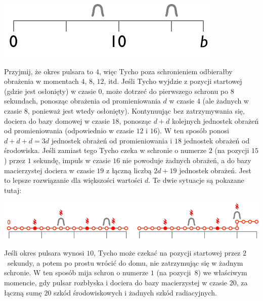 \includegraphics[width=.3\textwidth]{img/samplesetup}

Przyjmij, że okres pulsara to $4$, więc Tycho poza schronieniem odbierałby obrażenia w momentach $4$, $8$, $12$, itd.
Jeśli Tycho wyjdzie z pozycji startowej (gdzie jest osłonięty) w czasie $0$, może dotrzeć do pierwszego schronu po $8$ sekundach, ponosząc obrażenia od promieniowania $d$ w czasie $4$ (ale żadnych w czasie $8$, ponieważ jest wtedy osłonięty).
Kontynuując bez zatrzymywania się, dociera do bazy domowej w czasie $18$, ponosząc $d+d$ kolejnych jednostek obrażeń od promieniowania (odpowiednio w czasie $12$ i $16$).
W ten sposób ponosi $d+d+d=3d$ jednostek obrażeń od promieniowania i $18$ jednostek obrażeń od środowiska.
Jeśli zamiast tego Tycho czeka w schronie o numerze $2$ (na pozycji $15$) przez $1$ sekundę, impuls w czasie $16$ nie powoduje żadnych obrażeń, a do bazy macierzystej dociera w czasie $19$ z łączną liczbą $2d + 19$ jednostek obrażeń.
Jest to lepsze rozwiązanie dla większości wartości $d$.
Te dwie sytuacje są pokazane tutaj:

\includegraphics[width=.8\textwidth]{img/sample1_2.pdf}

Jeśli okres pulsara wynosi $10$, Tycho może czekać na pozycji startowej przez $2$~sekundy, a potem po prostu wrócić do domu, nie zatrzymując się w żadnym schronie.
W ten sposób mija schron o numerze $1$ (na pozycji~$8$) we właściwym momencie, gdy pulsar rozbłyska i dociera do bazy macierzystej w czasie $20$, za łączną sumę $20$ szkód środowiskowych i żadnych szkód radiacyjnych.

